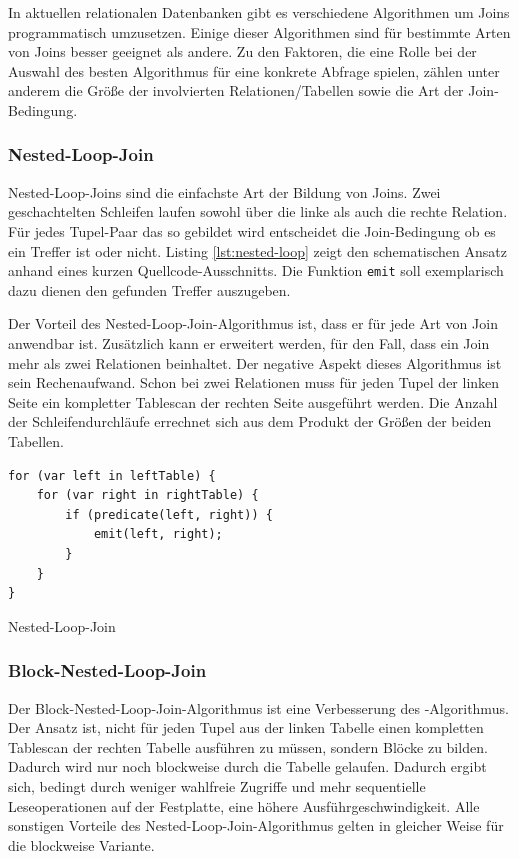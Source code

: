 \documentclass[a4paper]{article}
\begin{document}
In aktuellen relationalen Datenbanken gibt es verschiedene Algorithmen um Joins programmatisch umzusetzen. Einige dieser Algorithmen sind für bestimmte Arten von Joins besser geeignet als andere. Zu den Faktoren, die eine Rolle bei der Auswahl des besten Algorithmus für eine konkrete Abfrage spielen, zählen unter anderem die Größe der involvierten Relationen/Tabellen sowie die Art der Join-Bedingung.

\subsubsection{Nested-Loop-Join}
\label{sec:nested-loop}
Nested-Loop-Joins sind die einfachste Art der Bildung von Joins. Zwei geschachtelten Schleifen laufen sowohl über die linke als auch die rechte Relation. Für jedes Tupel-Paar das so gebildet wird entscheidet die Join-Bedingung ob es ein Treffer ist oder nicht. Listing \ref{lst:nested-loop} zeigt den schematischen Ansatz anhand eines kurzen Quellcode-Ausschnitts. Die Funktion \texttt{emit} soll exemplarisch dazu dienen den gefunden Treffer auszugeben.

Der Vorteil des Nested-Loop-Join-Algorithmus ist, dass er für jede Art von Join anwendbar ist. Zusätzlich kann er erweitert werden, für den Fall, dass ein Join mehr als zwei Relationen beinhaltet. Der negative Aspekt dieses Algorithmus ist sein Rechenaufwand. Schon bei zwei Relationen muss für jeden Tupel der linken Seite ein kompletter Tablescan der rechten Seite ausgeführt werden. Die Anzahl der Schleifendurchläufe errechnet sich aus dem Produkt der Größen der beiden Tabellen.

\begin{listing}[H]
\begin{verbatim}
for (var left in leftTable) {
    for (var right in rightTable) {
        if (predicate(left, right)) {
            emit(left, right);
        }
    }
}
\end{verbatim}
\caption{Nested-Loop-Join}
\label{lst:nested-loop}
\end{listing}

\newpage
\subsubsection{Block-Nested-Loop-Join}
Der Block-Nested-Loop-Join-Algorithmus ist eine Verbesserung des -Algorithmus. Der Ansatz ist, nicht für jeden Tupel aus der linken Tabelle einen kompletten Tablescan der rechten Tabelle ausführen zu müssen, sondern Blöcke zu bilden. Dadurch wird nur noch blockweise durch die Tabelle gelaufen. Dadurch ergibt sich, bedingt durch weniger wahlfreie Zugriffe und mehr sequentielle Leseoperationen auf der Festplatte, eine höhere Ausführgeschwindigkeit. Alle sonstigen Vorteile des Nested-Loop-Join-Algorithmus gelten in gleicher Weise für die blockweise Variante.
\end{document}
